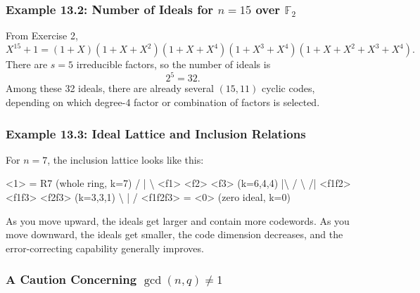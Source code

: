 \documentclass[
]{article}
\newenvironment{Shaded}{}{}
\newcommand{\NormalTok}[1]{#1}
\begin{document}
\subsubsection{\texorpdfstring{Example 13.2: Number of Ideals for
\(n=15\) over
\(\mathbb{F}_2\)}{Example 13.2: Number of Ideals for n=15 over \textbackslash mathbb\{F\}\_2}}\label{example-13.2-number-of-ideals-for-n15-over-mathbbf_2}

From Exercise 2,
\[X^{15}+1 = (1+X)(1+X+X^2)(1+X+X^4)(1+X^3+X^4)(1+X+X^2+X^3+X^4).\]
There are \(s=5\) irreducible factors, so the number of ideals is
\[2^5=32.\] Among these 32 ideals, there are already several \((15,11)\)
cyclic codes, depending on which degree-4 factor or combination of
factors is selected.

\subsubsection{Example 13.3: Ideal Lattice and Inclusion
Relations}\label{example-13.3-ideal-lattice-and-inclusion-relations}

For \(n=7\), the inclusion lattice looks like this:

\begin{Shaded}
\begin{Highlighting}[]
\NormalTok{        \textless{}1\textgreater{} = R7  (whole ring, k=7)}
\NormalTok{       / |  \textbackslash{}}
\NormalTok{   \textless{}f1\textgreater{} \textless{}f2\textgreater{} \textless{}f3\textgreater{}   (k=6,4,4)}
\NormalTok{     |\textbackslash{} / \textbackslash{} /|}
\NormalTok{  \textless{}f1f2\textgreater{} \textless{}f1f3\textgreater{} \textless{}f2f3\textgreater{}  (k=3,3,1)}
\NormalTok{       \textbackslash{}  |  /}
\NormalTok{      \textless{}f1f2f3\textgreater{} = \textless{}0\textgreater{}  (zero ideal, k=0)}
\end{Highlighting}
\end{Shaded}

As you move upward, the ideals get larger and contain more codewords. As
you move downward, the ideals get smaller, the code dimension decreases,
and the error-correcting capability generally improves.

\subsubsection{\texorpdfstring{A Caution Concerning
\(\gcd(n,q) \neq 1\)}{A Caution Concerning \textbackslash gcd(n,q) \textbackslash neq 1}}\label{caution-when-gcdnq-neq-1}
\end{document}
